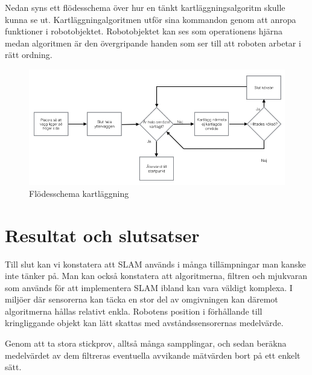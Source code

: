 \documentclass[a4paper,12pt,fleqn]{article}
\begin{document}
Nedan syns ett flödesschema över hur en tänkt kartläggningsalgoritm skulle kunna se ut. Kartläggningalgoritmen utför sina kommandon genom att anropa funktioner i robotobjektet. Robotobjektet kan ses som operationens hjärna medan algoritmen är den övergripande handen som ser till att roboten arbetar i rätt ordning. 

\begin{figure}[htp] %
  \begin{center}
  \includegraphics[keepaspectratio=true,scale=0.5]{../../Designspec/Flode_kartritning.jpg}  %
  \end{center}
  \caption{Flödesschema kartläggning} %
  \label{fig:fire} %
\end{figure}

\newpage
\section{Resultat och slutsatser}

Till slut kan vi konstatera att SLAM används i många tillämpningar man kanske inte tänker på. Man kan också konstatera att algoritmerna, filtren och mjukvaran som används för att implementera SLAM ibland kan vara väldigt komplexa. I miljöer där sensorerna kan täcka en stor del av omgivningen kan däremot algoritmerna hållas relativt enkla. Robotens position i förhållande till kringliggande objekt kan lätt skattas med avståndssensorernas medelvärde. 

Genom att ta stora stickprov, alltså många sampplingar, och sedan beräkna medelvärdet av dem filtreras eventuella avvikande mätvärden bort på ett enkelt sätt. 
\end{document}
